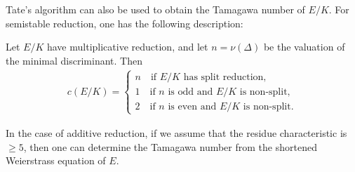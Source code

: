 Tate's algorithm can also be used to obtain the Tamagawa number of $E / K$. For semistable reduction, one has the following description:

\begin{prop}
    Let $E/K$ have multiplicative reduction, and let $n=\nu(\Delta)$ be the valuation of the minimal discriminant. Then
    \begin{align*}
        c(E/K)=
        \begin{cases}
            n \quad\text{if $E/K$ has split reduction,}\\
            1 \quad\text{if $n$ is odd and $E/K$ is non-split,}\\
            2 \quad\text{if $n$ is even and $E/K$ is non-split}.
        \end{cases}    
    \end{align*}
\end{prop}

In the case of additive reduction, if we assume that the residue characteristic is $\geq 5$, then one can determine the Tamagawa number from the shortened Weierstrass equation of $E$.

